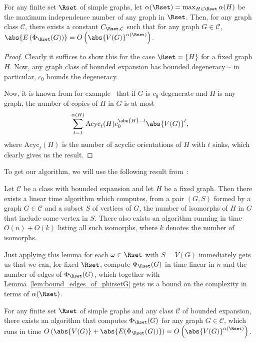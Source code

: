 \documentclass[a4paper,reqno,oneside]{article} %
\begin{document}
\begin{lemma}\label{lem:bound_edges_of_phirsetG}
    For any finite set $\Rset$ of simple graphs, let $\alpha(\Rset) = \max_{H \in \Rset} \alpha(H)$ be the maximum independence number of any graph in $\Rset$. Then, for any graph class $\mathcal{C}$, there exists a constant $C_{\Rset,\mathcal{C}}$ such that for any graph $G \in \mathcal{C}$, $\abs{E\left(\Phi_\Rset(G)\right)} = O\left(\abs{V(G)}^{\alpha(\Rset)}\right)$.
\end{lemma}
\begin{proof}
    Clearly it suffices to show this for the case $\Rset = \{H\}$ for a fixed graph $H$. Now, any graph class of bounded expansion has bounded degeneracy -- in particular, $c_0$ bounds the degeneracy.

    Now, it is known from for example~\cite[Exercise 3.2, p.~59]{sparsity_book} that if $G$ is $c_0$-degenerate and $H$ is any graph, the number of copies of $H$ in $G$ is at most
    $$\sum_{t=1}^{\alpha(H)} \mathrm{Acyc}_t(H) c_0^{\abs{H}-t} \abs{V(G)}^t,$$
    where $\mathrm{Acyc}_t(H)$ is the number of acyclic orientations of $H$ with $t$ sinks, which clearly gives us the result.
\end{proof}

To get our algorithm, we will use the following result from~\cite[Corollary 18.2, p.~407]{sparsity_book}:

\begin{lemma}\label{lemma_subgraph_counting_bounded_exp}
    Let $\mathcal{C}$ be a class with bounded expansion and let $H$ be a fixed graph. Then there exists a linear time algorithm which computes, from a pair $(G,S)$ formed by a graph $G \in \mathcal{C}$ and a subset $S$ of vertices of $G$, the number of isomorphs of $H$ in $G$ that include some vertex in $S$. There also exists an algorithm running in time $O(n) + O(k)$ listing all such isomorphs, where $k$ denotes the number of isomorphs.
\end{lemma}

Just applying this lemma for each $\omega \in \Rset$ with $S = V(G)$ immediately gets us that we can, for fixed $\Rset$, compute $\Phi_\Rset(G)$ in time linear in $n$ and the number of edges of $\Phi_\Rset(G)$, which together with Lemma~\ref{lem:bound_edges_of_phirsetG} gets us a bound on the complexity in terms of $\alpha(\Rset)$.

\begin{theorem}
    For any finite set $\Rset$ of simple graphs and any class $\mathcal{C}$ of bounded expansion, there exists an algorithm that computes $\Phi_\Rset(G)$ for any graph $G \in \mathcal{C}$, which runs in time $O\left(\abs{V(G)} + \abs{E(\Phi_\Rset(G))}\right) = O\left(\abs{V(G)}^{\alpha(\Rset)}\right)$.
\end{theorem}
\end{document}
